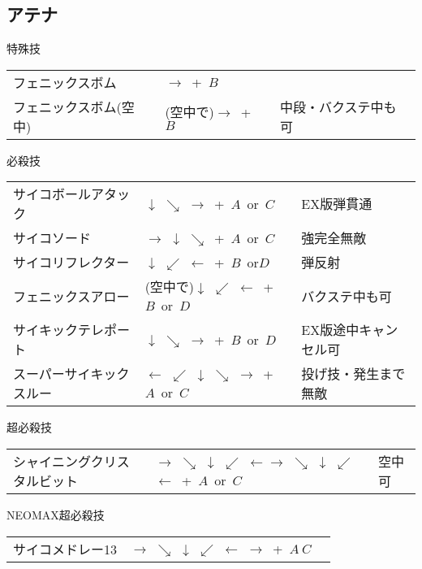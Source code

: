 \documentclass[a4j,11pt]{jarticle}
\def\hado{$\downarrow$ $\searrow$ $\rightarrow$}%
\def\tatsu{$\downarrow$ $\swarrow$ $\leftarrow$}%
\def\syoryu{$\rightarrow$ $\downarrow$ $\searrow$}%
\def\yoga{$\leftarrow$ $\swarrow$ $\downarrow$ $\searrow$ $\rightarrow$}%
\def\gyakuyoga{$\rightarrow$ $\searrow$ $\downarrow$ $\swarrow$ $\leftarrow$}%
\def\tenti{$\rightarrow$ $\searrow$ $\downarrow$ $\swarrow$ $\leftarrow$ $\rightarrow$}%
\begin{document}
\subsection{アテナ}
\begin{itembox}[l]{特殊技}
\begin{tabular}{lll}
フェニックスボム&$\rightarrow$\ +\ $B$&\\
フェニックスボム(空中)&(空中で)$\rightarrow$\ +\ $B$&中段・バクステ中も可
\end{tabular}
\end{itembox}
\begin{itembox}[l]{必殺技}
\begin{tabular}{lll}
サイコボールアタック&\hado\ +\ $A$\ or\ $C$&EX版弾貫通\\
サイコソード&\syoryu\ +\ $A$\ or\ $C$&強完全無敵\\
サイコリフレクター&\tatsu\ +\ $B$\ or$D$&弾反射\\
フェニックスアロー&(空中で)\tatsu\ +\ $B$\ or\ $D$&バクステ中も可\\
サイキックテレポート&\hado\ +\ $B$\ or\ $D$&EX版途中キャンセル可\\
スーパーサイキックスルー&\yoga\ +\ $A$\ or\ $C$&投げ技・発生まで無敵
\end{tabular}
\end{itembox}
\begin{itembox}[l]{超必殺技}
\begin{tabular}{lll}
シャイニングクリスタルビット&\gyakuyoga\gyakuyoga\ +\ $A$\ or\ $C$&空中可
\end{tabular}
\end{itembox}
\begin{itembox}[l]{NEOMAX超必殺技}
\begin{tabular}{lll}
サイコメドレー13&\tenti\ +\ $A\ C$&
\end{tabular}
\end{itembox}
\newpage
\end{document}
